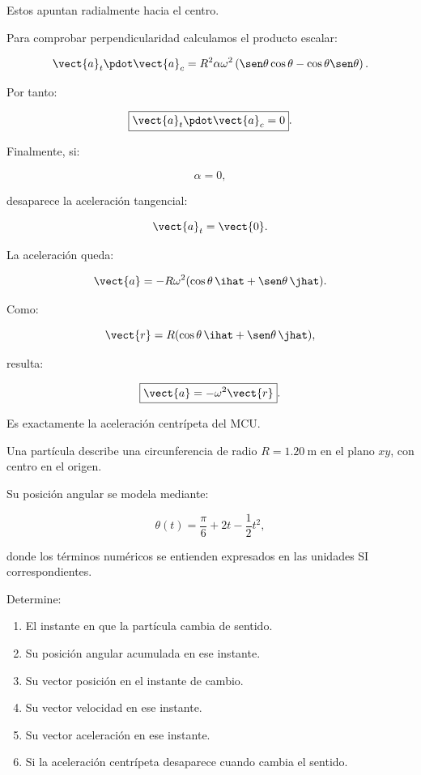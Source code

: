 \begin{explicacion}
Estos apuntan radialmente hacia el centro.

Para comprobar perpendicularidad calculamos el producto
escalar:

\[
\vect{a}_t\pdot\vect{a}_c
=
R^2\alpha\omega^2
\left(
\sen\theta\cos\theta
-
\cos\theta\sen\theta
\right).
\]

Por tanto:

\[
\boxed{\vect{a}_t\pdot\vect{a}_c=0}.
\]

Finalmente, si:

\[
\alpha=0,
\]

desaparece la aceleración tangencial:

\[
\vect{a}_t=\vect{0}.
\]

La aceleración queda:

\[
\vect{a}
=-R\omega^2(\cos\theta\,\ihat+\sen\theta\,\jhat).
\]

Como:

\[
\vect{r}=R(\cos\theta\,\ihat+\sen\theta\,\jhat),
\]

resulta:

\[
\boxed{\vect{a}=-\omega^2\vect{r}}.
\]

Es exactamente la aceleración centrípeta del MCU.
\end{explicacion}


\begin{ejercicio}
Una partícula describe una circunferencia de radio
\(R=\SI{1.20}{\meter}\) en el plano \(xy\), con centro
en el origen.

Su posición angular se modela mediante:

\[
\theta(t)
=
\frac{\pi}{6}+2t-\frac12t^2,
\]

donde los términos numéricos se entienden expresados en las
unidades SI correspondientes.

Determine:

\begin{enumerate}[label=\alph*)]
    \item El instante en que la partícula cambia de sentido.
    \item Su posición angular acumulada en ese instante.
    \item Su vector posición en el instante de cambio.
    \item Su vector velocidad en ese instante.
    \item Su vector aceleración en ese instante.
    \item Si la aceleración centrípeta desaparece cuando cambia
    el sentido.
\end{enumerate}
\end{ejercicio}

